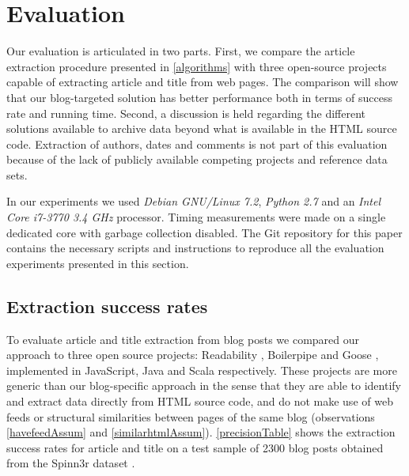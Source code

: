 \section{Evaluation}\label{evaluation}

Our evaluation is articulated in two parts. First, we compare the article extraction procedure presented in \autoref{algorithms} with three open-source projects capable of extracting article and title from web pages. The comparison will show that our blog-targeted solution has better performance both in terms of success rate and running time. Second, a discussion is held regarding the different solutions available to archive data beyond what is available in the HTML source code. Extraction of authors, dates and comments is not part of this evaluation because of the lack of publicly available competing projects and reference data sets.

In our experiments we used \emph{Debian GNU/Linux 7.2}, \emph{Python 2.7} and an \emph{Intel Core i7-3770 3.4 GHz} processor. Timing measurements were made on a single dedicated core with garbage collection disabled. The Git repository for this paper \cite{repositoryofthispaper} contains the necessary scripts and instructions to reproduce all the evaluation experiments presented in this section.


\subsection{Extraction success rates}
To evaluate article and title extraction from blog posts we compared our approach to three open source projects: Readability \cite{python-readability2011}, Boilerpipe \cite{kohlschuetter2010} and Goose \cite{goose2012}, implemented in JavaScript, Java and Scala respectively. These projects are more generic than our blog-specific approach in the sense that they are able to identify and extract data directly from HTML source code, and do not make use of web feeds or structural similarities between pages of the same blog (observations \ref{havefeedAssum} and \ref{similarhtmlAssum}). \autoref{precisionTable} shows the extraction success rates for article and title on a test sample of 2300 blog posts obtained from the Spinn3r dataset \cite{burton2011}.


